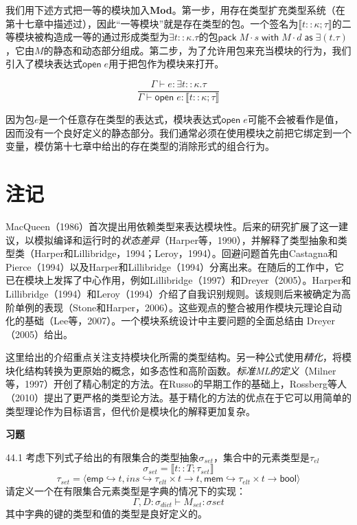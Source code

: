我们用下述方式把一等的模块加入\textbf{Mod}。第一步，用存在类型扩充类型系统（在第十七章中描述过），因此“一等模块”就是存在类型的包。一个签名为$\llbracket t::\kappa;\tau\rrbracket $的二等模块被构造成一等的通过形成类型为$\exists t::\kappa . \tau$的包$\mathsf{pack}\;M\cdot s\;\mathsf{with}\;M\cdot d \;\mathsf{as} \;\exists (t.\tau)$，它由$M$的静态和动态部分组成。第二步，为了允许用包来充当模块的行为，我们引入了模块表达式$\mathsf{open}\;e$用于把包作为模块来打开。

\begin{equation}\label{44_8}
\frac{\Gamma\vdash e : \exists t::\kappa . \tau}{\Gamma \vdash \mathsf{open}\;e:\llbracket t::\kappa;\tau\rrbracket }
\end{equation}

因为包$e$是一个任意存在类型的表达式，模块表达式$\mathsf{open}\;e$可能不会被看作是值，因而没有一个良好定义的静态部分。我们通常必须在使用模块之前把它绑定到一个变量，模仿第十七章中给出的存在类型的消除形式的组合行为。


\section{注记}
MacQueen（1986）首次提出用依赖类型来表达模块性。后来的研究扩展了这一建议，以模拟编译和运行时的\textit{状态差异}（Harper等，1990），并解释了类型抽象和类型类（Harper和Lillibridge，1994；Leroy，1994）。回避问题首先由Castagna和Pierce（1994）以及Harper和Lillibridge（1994）分离出来。在随后的工作中，它已在模块上发挥了中心作用，例如Lillibridge（1997）和Dreyer（2005）。Harper和Lillibridge（1994）和Leroy（1994）介绍了自我识别规则。该规则后来被确定为高阶单例的表现（Stone和Harper，2006）。这些观点的整合被用作模块元理论自动化的基础（Lee等，2007）。一个模块系统设计中主要问题的全面总结由 Dreyer（2005）给出。

这里给出的介绍重点关注支持模块化所需的类型结构。另一种公式使用\textit{精化}，将模块化结构转换为更原始的概念，如多态性和高阶函数。\textit{标准ML的定义}（Milner等，1997）开创了精心制定的方法。在Russo的早期工作的基础上，Rossberg等人（2010）提出了更严格的类型论方法。基于精化的方法的优点在于它可以用简单的类型理论作为目标语言，但代价是模块化的解释更加复杂。

\textbf{习题}


44.1 考虑下列式子给出的有限集合的类型抽象$\sigma_{set}$，集合中的元素类型是$\tau_{el}$
$$\sigma_{set} = \llbracket t::T;\tau_{set}\rrbracket $$
$$\tau_{set} = \langle \mathsf{emp} \hookrightarrow t,ins \hookrightarrow \tau_{elt} \times t \rightarrow t,\mathsf{mem} \hookrightarrow \tau_{elt} \times t \rightarrow \mathsf{bool} \rangle$$
请定义一个在有限集合元素类型是字典的情况下的实现：
$$\Gamma,D:\sigma_{dict}\vdash M_{set}:\sigma{set}$$
其中字典的键的类型和值的类型是良好定义的。


